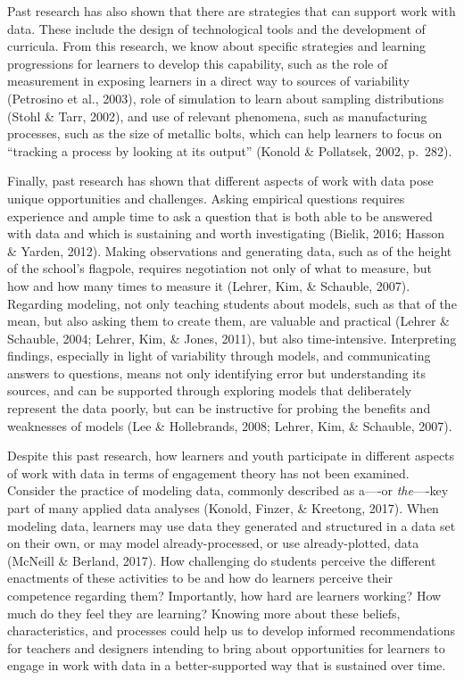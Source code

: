 \documentclass[]{book}
\theoremstyle{definition}
\theoremstyle{definition}
\theoremstyle{definition}
\theoremstyle{remark}
\begin{document}
Past research has also shown that there are strategies that can support
work with data. These include the design of technological tools and the
development of curricula. From this research, we know about specific
strategies and learning progressions for learners to develop this
capability, such as the role of measurement in exposing learners in a
direct way to sources of variability (Petrosino et al., 2003), role of
simulation to learn about sampling distributions (Stohl \& Tarr, 2002),
and use of relevant phenomena, such as manufacturing processes, such as
the size of metallic bolts, which can help learners to focus on
``tracking a process by looking at its output'' (Konold \& Pollatsek,
2002, p.~282).

Finally, past research has shown that different aspects of work with
data pose unique opportunities and challenges. Asking empirical
questions requires experience and ample time to ask a question that is
both able to be answered with data and which is sustaining and worth
investigating (Bielik, 2016; Hasson \& Yarden, 2012). Making
observations and generating data, such as of the height of the school's
flagpole, requires negotiation not only of what to measure, but how and
how many times to measure it (Lehrer, Kim, \& Schauble, 2007). Regarding
modeling, not only teaching students about models, such as that of the
mean, but also asking them to create them, are valuable and practical
(Lehrer \& Schauble, 2004; Lehrer, Kim, \& Jones, 2011), but also
time-intensive. Interpreting findings, especially in light of
variability through models, and communicating answers to questions,
means not only identifying error but understanding its sources, and can
be supported through exploring models that deliberately represent the
data poorly, but can be instructive for probing the benefits and
weaknesses of models (Lee \& Hollebrands, 2008; Lehrer, Kim, \&
Schauble, 2007).

Despite this past research, how learners and youth participate in
different aspects of work with data in terms of engagement theory has
not been examined. Consider the practice of modeling data, commonly
described as a----or \emph{the}----key part of many applied data
analyses (Konold, Finzer, \& Kreetong, 2017). When modeling data,
learners may use data they generated and structured in a data set on
their own, or may model already-processed, or use already-plotted, data
(McNeill \& Berland, 2017). How challenging do students perceive the
different enactments of these activities to be and how do learners
perceive their competence regarding them? Importantly, how hard are
learners working? How much do they feel they are learning? Knowing more
about these beliefs, characteristics, and processes could help us to
develop informed recommendations for teachers and designers intending to
bring about opportunities for learners to engage in work with data in a
better-supported way that is sustained over time.
\end{document}
